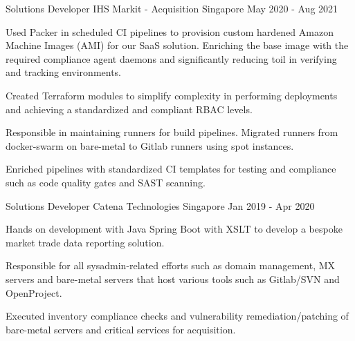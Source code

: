 \begin{cventries}

  \cventry
  {Solutions Developer} %
  {IHS Markit - Acquisition} %
  {Singapore} %
  {May 2020 - Aug 2021} %
  {
    \begin{cvitems} %
      \item {Used Packer in scheduled CI pipelines to provision custom hardened Amazon Machine Images (AMI) for our SaaS solution. Enriching the base image with the required compliance agent daemons and significantly reducing toil in verifying and tracking environments.}
      \item {Created Terraform modules to simplify complexity in performing deployments and achieving a standardized and compliant RBAC levels.}
      \item {Responsible in maintaining runners for build pipelines. Migrated runners from docker-swarm on bare-metal to Gitlab runners using spot instances.}
      \item {Enriched pipelines with standardized CI templates for testing and compliance such as code quality gates and SAST scanning.}
    \end{cvitems}
  }



  \cventry
  {Solutions Developer} %
  {Catena Technologies} %
  {Singapore} %
  {Jan 2019 - Apr 2020} %
  {
    \begin{cvitems} %
      \item {Hands on development with Java Spring Boot with XSLT to develop a bespoke market trade data reporting solution.}
      \item {Responsible for all sysadmin-related efforts such as domain management, MX servers and bare-metal servers that host various tools such as Gitlab/SVN and OpenProject.}
      \item {Executed inventory compliance checks and vulnerability remediation/patching of bare-metal servers and critical services for acquisition.}
    \end{cvitems}
  }

\end{cventries}
